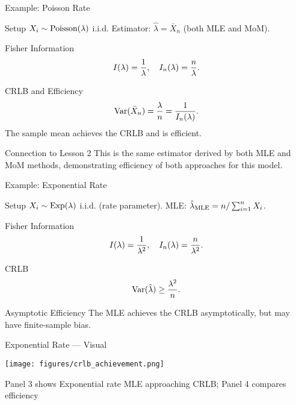 \begin{frame}{Example: Poisson Rate}
  \begin{block}{Setup}
    $X_i \sim \text{Poisson}(\lambda)$ i.i.d.
    Estimator: $\hat{\lambda} = \bar{X}_n$ (both MLE and MoM).
  \end{block}

  \begin{block}{Fisher Information}
    \[I(\lambda) = \frac{1}{\lambda}, \quad I_n(\lambda) = \frac{n}{\lambda}.\]
  \end{block}

  \begin{block}{CRLB and Efficiency}
    \[\operatorname{Var}(\bar{X}_n) = \frac{\lambda}{n} = \frac{1}{I_n(\lambda)}.\]
    The sample mean achieves the CRLB and is efficient.
  \end{block}

  \begin{block}{Connection to Lesson 2}
    This is the same estimator derived by both MLE and MoM methods,
    demonstrating efficiency of both approaches for this model.
  \end{block}
\end{frame}

\begin{frame}{Example: Exponential Rate}
  \begin{block}{Setup}
    $X_i \sim \text{Exp}(\lambda)$ i.i.d. (rate parameter).
    MLE: $\hat{\lambda}_{\text{MLE}} = n / \sum_{i=1}^n X_i$.
  \end{block}

  \begin{block}{Fisher Information}
    \[I(\lambda) = \frac{1}{\lambda^2}, \quad I_n(\lambda) = \frac{n}{\lambda^2}.\]
  \end{block}

  \begin{block}{CRLB}
    \[\operatorname{Var}(\hat{\lambda}) \geq \frac{\lambda^2}{n}.\]
  \end{block}

  \begin{block}{Asymptotic Efficiency}
    The MLE achieves the CRLB asymptotically, but may have finite-sample bias.
  \end{block}
\end{frame}

\begin{frame}{Exponential Rate --- Visual}
  \begin{center}
    \texttt{[image: figures/crlb\_achievement.png]}

    \vspace{-0.3cm}
    \footnotesize Panel 3 shows Exponential rate MLE approaching CRLB; Panel 4 compares efficiency
  \end{center}
\end{frame}

